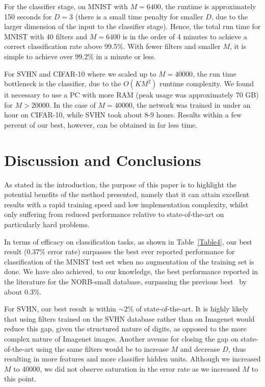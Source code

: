 \documentclass[conference]{IEEEtran}
\begin{document}
For the classifier stage, on MNIST with $M=6400$, the runtime is approximately 150 seconds for $D=3$ (there is a small time penalty for smaller $D$, due to the larger dimension of the input to the classifier stage). Hence, the total run time for MNIST with 40 filters and $M=6400$ is in the order of 4 minutes to achieve a correct classification rate above  99.5\%. With fewer filters and smaller $M$, it is simple to achieve over 99.2\% in a minute or less.

For SVHN and CIFAR-10 where we scaled up to $M=40000$, the run time bottleneck is the classifier, due to the $O(KM^2)$ runtime complexity. We found it necessary to use a PC with more RAM (peak usage was approximately 70 GB) for $M>20000$. In the case of $M=40000$, the network was trained in under an hour on CIFAR-10, while SVHN took about 8-9 hours.  Results within a few percent of our best, however, can be obtained in far less time.


\section{Discussion and Conclusions}\label{S:5}

As stated in the introduction, the purpose of this paper is to highlight the potential benefits of the method presented, namely that it can attain excellent results with a rapid training speed  and low implementation complexity, whilst only suffering from reduced performance relative to state-of-the-art on particularly hard problems.

In terms of efficacy on classification tasks, as shown in Table~\ref{Table4}, our best result (0.37\% error rate) surpasses the best ever reported performance for classification of the MNIST test set when no  augmentation of the training set is done. We have also achieved, to our knowledge, the best performance reported in the literature for the NORB-small database, surpassing the previous best~\cite{Ciresan.11} by about 0.3\%.

For SVHN, our best result is within $\sim2$\% of state-of-the-art. It is highly likely that using  filters trained on the SVHN database rather than on Imagenet would reduce this gap, given the structured nature of digits, as opposed to the more complex nature of Imagenet images. Another avenue for closing the gap on state-of-the-art using the same filters would be to increase $M$ and decrease $D$, thus resulting in more features and more classifier hidden units. Although we increased $M$ to 40000, we did not observe saturation in the error rate as we increased $M$ to this point.
\end{document}
